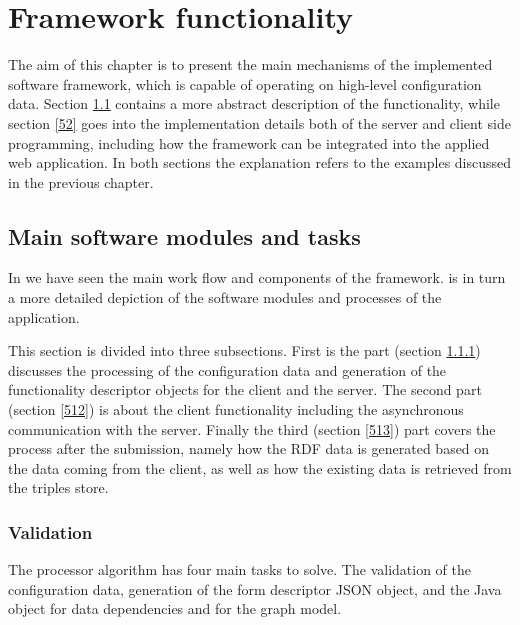 
\chapter{Framework functionality} \label{5}


The aim of this chapter is to present the main mechanisms of the implemented software framework, which is capable of operating on high-level configuration data. Section \ref{51} contains a more abstract description of the functionality, while section \ref{52} goes into the implementation details both of the server and client side programming, including how the framework can be integrated into the applied web application. In both sections the explanation refers to the examples discussed in the previous chapter.


\section{Main software modules and tasks} \label{51}


In  we have seen the main work flow and components of the framework.  is in turn a more detailed depiction of the software modules and processes of the application.




This section is divided into three subsections. First is the part (section \ref{511}) discusses the  processing of the configuration data and generation of the functionality descriptor objects for the client and the server. The second part (section \ref{512}) is about the client functionality including the asynchronous communication with the server. Finally the third (section \ref{513}) part covers the process after the submission, namely how the RDF data is generated based on the data coming from the client, as well as how the existing data is retrieved from the triples store.


\subsection{Validation} \label{511}


The processor algorithm has four main tasks to solve. The validation of the configuration data, generation of the form descriptor JSON object, and the Java object for data dependencies and for  the graph model. 




